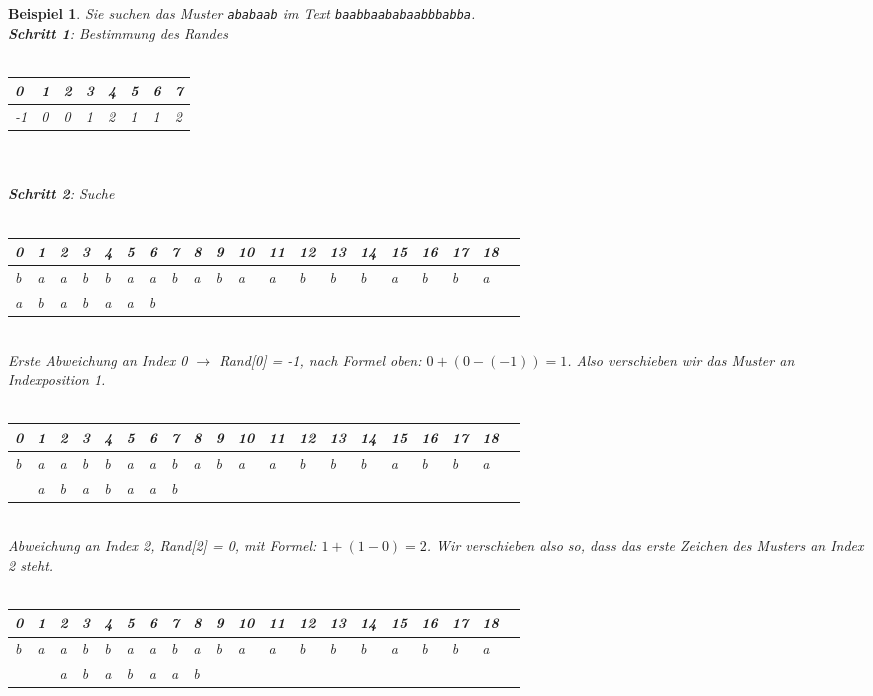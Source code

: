 \documentclass[11pt,a4paper]{scrartcl}
\newtheorem{example}{Beispiel}
\begin{document}
\begin{example}
Sie suchen das Muster \texttt{ababaab} im Text \texttt{baabbaababaabbbabba}. \\
\textbf{Schritt 1}: Bestimmung des Randes \\\\
\begin{tabular}{|l|l|l|l|l|l|l|l|}
 0 & 1 & 2 & 3 & 4 & 5 & 6 & 7 \\
\hline
-1 & 0 & 0 & 1 & 2 & 1 & 1 & 2 \\
\end{tabular} \\\\
\textbf{Schritt 2}: Suche \\\\
\begin{tabular}{|l|l|l|l|l|l|l|l|l|l|l|l|l|l|l|l|l|l|l|l|}
\hline
0 & 1 & 2&3&4&5&6&7&8&9&10&11&12&13&14&15&16&17&18 \\
\hline
b&a&a&b&b&a&a&b&a&b&a&a&b&b&b&a&b&b&a \\
\hline
a&b&a&b&a&a&b& & & & & & & & & & & & \\
\hline
\end{tabular} \\
Erste Abweichung an Index 0 $\to$ Rand[0] = -1, nach Formel oben: $0+(0-(-1)) = 1$. Also verschieben wir das Muster an Indexposition 1. \\\\
\begin{tabular}{|l|l|l|l|l|l|l|l|l|l|l|l|l|l|l|l|l|l|l|l|}
\hline
0&1&2&3&4&5&6&7&8&9&10&11&12&13&14&15&16&17&18 \\
\hline
b&a&a&b&b&a&a&b&a&b&a&a&b&b&b&a&b&b&a \\
\hline
 &a&b&a&b&a&a&b& & & & & & & & & & &  \\
\hline
\end{tabular} \\
Abweichung an Index 2, Rand[2] = 0, mit Formel: $1+(1-0) = 2$. Wir verschieben also so, dass das erste Zeichen des Musters an Index 2 steht.  \\\\
\begin{tabular}{|l|l|l|l|l|l|l|l|l|l|l|l|l|l|l|l|l|l|l|l|}
\hline
0&1&2&3&4&5&6&7&8&9&10&11&12&13&14&15&16&17&18 \\
\hline
b&a&a&b&b&a&a&b&a&b&a&a&b&b&b&a&b&b&a \\
\hline
 & &a&b&a&b&a&a&b& & & & & & & & & &   \\
\hline
\end{tabular}\\

\end{example}
\end{document}
